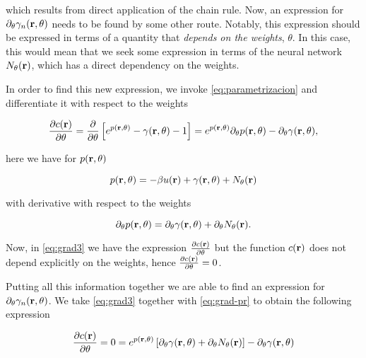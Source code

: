 which results from direct application of the chain rule. Now, an expression for
$\partial_{\theta} \gamma_{n}(\mathbf{r}, \theta)$ needs to
be found by some other route. Notably, this expression should be expressed in terms
of a quantity that \emph{depends on the weights}, $\theta$. In this case, 
this would mean that we seek some expression in terms of the neural
network $N_{\theta}(\mathbf{r})$, which has a direct dependency on the weights.

In order to find this new expression, we invoke \autoref{eq:parametrizacion} and
differentiate it with respect to the weights

\begin{equation}
    \frac{\partial c(\mathbf{r})}{\partial \theta} = \frac{\partial}{\partial \theta}
    \left[ e^{p(\mathbf{r}, \theta)} - \gamma(\mathbf{r}, \theta) - 1 \right] =
    e^{p(\mathbf{r}, \theta)} \partial_{\theta} p(\mathbf{r}, \theta) - \partial_{\theta} \gamma(\mathbf{r}, \theta)
    ,
    \label{eq:grad3}
\end{equation}

here we have for $p(\mathbf{r}, \theta)$

\begin{equation}
    p(\mathbf{r}, \theta) = -\beta u(\mathbf{r}) + \gamma(\mathbf{r}, \theta) + N_{\theta}(\mathbf{r})
    \label{eq:pr}    
\end{equation}

with derivative with respect to the weights

\begin{equation}
    \partial_{\theta} p(\mathbf{r}, \theta) = \partial_{\theta} \gamma(\mathbf{r}, \theta) + \partial_{\theta} N_{\theta}(\mathbf{r})
    .
    \label{eq:grad-pr}
\end{equation}

Now, in \autoref{eq:grad3} we have the expression 
$\frac{\partial c(\mathbf{r})}{\partial \theta}$
but the function $c(\mathbf{r})$ does not depend explicitly on the weights, hence
$\frac{\partial c(\mathbf{r})}{\partial \theta} = 0$.

Putting all this information together we are able to find an expression for
$\partial_{\theta} \gamma_{n}(\mathbf{r}, \theta)$.
We take \autoref{eq:grad3} together with \autoref{eq:grad-pr} to obtain the following
expression

\begin{equation}
    \frac{\partial c(\mathbf{r})}{\partial \theta} = 0 =
    e^{p(\mathbf{r}, \theta)} \left[ \partial_{\theta} \gamma(\mathbf{r}, \theta) + \partial_{\theta} N_{\theta}(\mathbf{r}) \right]
    - \partial_{\theta} \gamma(\mathbf{r}, \theta)
    \label{eq:grad4}
\end{equation}

